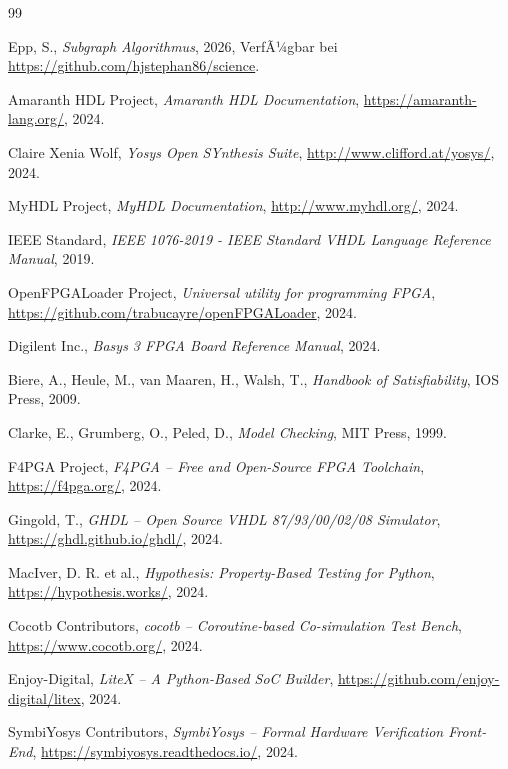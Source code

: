 ﻿\documentclass[12pt,a4paper]{report}
\begin{document}
\begin{thebibliography}{99}

  Epp, S.,
  \textit{Subgraph Algorithmus},
  2026, VerfÃ¼gbar bei \url{https://github.com/hjstephan86/science}.

  Amaranth HDL Project,
  \textit{Amaranth HDL Documentation},
  \url{https://amaranth-lang.org/},
  2024.

  Claire Xenia Wolf,
  \textit{Yosys Open SYnthesis Suite},
  \url{http://www.clifford.at/yosys/},
  2024.

  MyHDL Project,
  \textit{MyHDL Documentation},
  \url{http://www.myhdl.org/},
  2024.

  IEEE Standard,
  \textit{IEEE 1076-2019 - IEEE Standard VHDL Language Reference Manual},
  2019.

  OpenFPGALoader Project,
  \textit{Universal utility for programming FPGA},
  \url{https://github.com/trabucayre/openFPGALoader},
  2024.

  Digilent Inc.,
  \textit{Basys 3 FPGA Board Reference Manual},
  2024.

  Biere, A., Heule, M., van Maaren, H., Walsh, T.,
  \textit{Handbook of Satisfiability},
  IOS Press, 2009.

  Clarke, E., Grumberg, O., Peled, D.,
  \textit{Model Checking},
  MIT Press, 1999.

  F4PGA Project,
  \textit{F4PGA -- Free and Open-Source FPGA Toolchain},
  \url{https://f4pga.org/},
  2024.

  Gingold, T.,
  \textit{GHDL -- Open Source VHDL 87/93/00/02/08 Simulator},
  \url{https://ghdl.github.io/ghdl/},
  2024.

  MacIver, D. R. et al.,
  \textit{Hypothesis: Property-Based Testing for Python},
  \url{https://hypothesis.works/},
  2024.

  Cocotb Contributors,
  \textit{cocotb -- Coroutine-based Co-simulation Test Bench},
  \url{https://www.cocotb.org/},
  2024.

  Enjoy-Digital,
  \textit{LiteX -- A Python-Based SoC Builder},
  \url{https://github.com/enjoy-digital/litex},
  2024.

  SymbiYosys Contributors,
  \textit{SymbiYosys -- Formal Hardware Verification Front-End},
  \url{https://symbiyosys.readthedocs.io/},
  2024.


\end{thebibliography}
\end{document}
